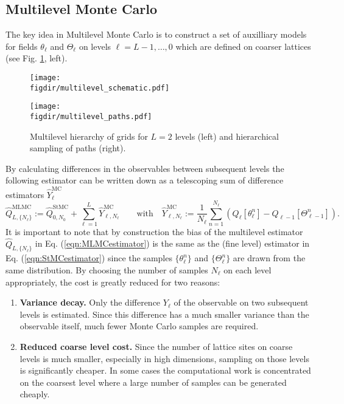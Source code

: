 \documentclass[11pt]{article}
\newcommand{\figdir}{./figures/}
\begin{document}
\subsection{Multilevel Monte Carlo}
The key idea in Multilevel Monte Carlo is to construct a set of auxilliary models for fields $\theta_\ell$ and $\Theta_\ell$ on levels $\ell=L-1,\dots,0$ which are defined on coarser lattices (see Fig. \ref{fig:multilevel}, left).
\begin{figure}
  \begin{center}
  \begin{minipage}{0.55\linewidth}
    \texttt{[image: \\figdir/multilevel\_schematic.pdf]}
  \end{minipage}
  \hfill
  \begin{minipage}{0.4\linewidth}
    \texttt{[image: \\figdir/multilevel\_paths.pdf]}
  \end{minipage}
  \caption{Multilevel hierarchy of grids for $L=2$ levels (left) and hierarchical sampling of paths (right).}\label{fig:multilevel}
  \end{center}
\end{figure}
By calculating differences in the observables between subsequent levels the following estimator can be written down as a telescoping sum of difference estimators $\hat{Y}^{\text{MC}}_\ell$
\begin{equation}
  \hat{Q}_{L,\{N_\ell\}}^{\text{MLMC}} := \hat{Q}_{0,N_0}^{\text{StMC}} + \sum_{\ell=1}^L \hat{Y}_{\ell,N_\ell}^{\text{MC}}\qquad\text{with}\quad
  \hat{Y}_{\ell,N_\ell}^{\text{MC}} :=  \frac{1}{N_\ell}\sum_{n=1}^{N_\ell} \left(Q_\ell[\theta_\ell^n] - Q_{\ell-1}[\Theta_{\ell-1}^n]\right).\label{eqn:MLMCestimator}
\end{equation}
It is important to note that by construction the bias of the multilevel estimator $\hat{Q}_{L,\{N_\ell\}}$ in Eq. (\ref{eqn:MLMCestimator}) is the same as the (fine level) estimator in Eq. (\ref{eqn:StMCestimator}) since the samples $\{\theta_\ell^n\}$ and $\{\Theta_\ell^n\}$ are drawn from the same distribution. By choosing the number of samples $N_\ell$ on each level appropriately, the cost is greatly reduced for two reasons:
\begin{enumerate}
\item \textbf{Variance decay.} Only the difference $Y_\ell$ of the observable on two subsequent levels is estimated. Since this difference has a much smaller variance than the observable itself, much fewer Monte Carlo samples are required. 
  \item \textbf{Reduced coarse level cost.} Since the number of lattice sites on coarse levels is much smaller, especially in high dimensions, sampling on those levels is significantly cheaper. In some cases the computational work is concentrated on the coarsest level where a large number of samples can be generated cheaply.
\end{enumerate}
\end{document}
